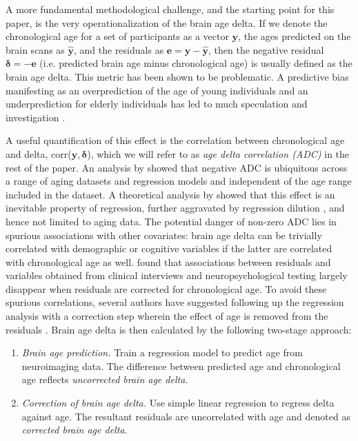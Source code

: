 \documentclass[utf8]{frontiersSCNS} %
\renewcommand{\d}{\boldsymbol{\delta}}
\newcommand{\e}{\mathbf{e}}
\newcommand{\y}{\mathbf{y}}
\newcommand{\yh}{\mathbf{\hat{y}}}
\begin{document}
A more fundamental methodological challenge, and the starting point for this paper, is the very operationalization of the brain age delta. If we denote the chronological age for a set of participants as a vector $\y$, the ages predicted on the brain scans as $\yh$, and the residuals as $\e = \y - \yh$, then the negative residual $\d = -\e$ (i.e. predicted brain age minus chronological age) is usually defined as the brain age delta. This metric has been shown to be problematic. A predictive bias manifesting as an overprediction of the age of young individuals and an underprediction for elderly individuals has led to much speculation and investigation  \citep{Aycheh2018BiologicalStudy,Beheshti2019Bias-adjustmentScheme,Cole2017PredictingBiomarker,Cole2015PredictionInjury,Le2018ABrainAGE,Liang2019InvestigatingDisorders,Smith2019EstimationImaging}. 

A useful quantification of this effect is the correlation between chronological age and delta, corr($\y, \d$), which we will refer to as \textit{age delta correlation (ADC)} in the rest of the paper. An analysis by \cite{Liang2019InvestigatingDisorders} showed that negative ADC is ubiquitous across a range of aging datasets and regression models and independent of the age range included in the dataset. A theoretical analysis by  \cite{Le2018ABrainAGE} showed that this effect is an inevitable property of regression, further aggravated by regression dilution \citep{Fuller1987MeasurementModels,MacMahon1990BloodBias}, and hence not limited to aging data. The potential danger of non-zero ADC lies in spurious associations with other covariates: brain age delta can be trivially correlated with demographic or cognitive variables if the latter are correlated with chronological age as well. \cite{Le2018ABrainAGE} found that associations between residuals and variables obtained from  clinical interviews and neuropsychological testing largely disappear when residuals are corrected for chronological age. To avoid these spurious correlations, several authors have suggested following up the regression analysis with a correction step wherein the effect of age is removed from the residuals \citep{Le2018ABrainAGE,Smith2019EstimationImaging,Beheshti2019Bias-adjustmentScheme}. Brain age delta is then calculated by the following two-stage approach:

\begin{enumerate}
    \item \textit{Brain age prediction.} Train a regression model to predict age from neuroimaging data. The difference between predicted age and chronological age reflects \textit{uncorrected brain age delta}.
    \item \textit{Correction of brain age delta.}
    Use simple linear regression to regress delta against age. The resultant residuals are uncorrelated with age and denoted as \textit{corrected brain age delta}. 
\end{enumerate}
\end{document}
